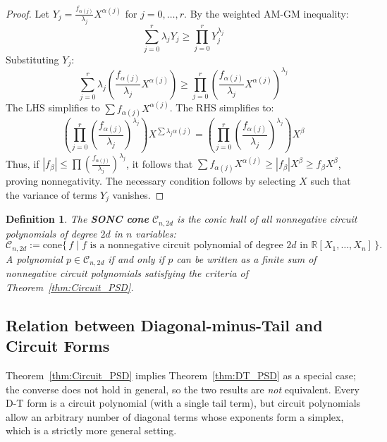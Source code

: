 \documentclass{article}
\newtheorem{definition}{Definition}
\begin{document}
\begin{proof}
Let $Y_j = \frac{f_{\alpha(j)}}{\lambda_j} X^{\alpha(j)}$ for $j = 0, \dots, r$. By the weighted AM-GM inequality:
\[
   \sum_{j=0}^r \lambda_j Y_j \geq \prod_{j=0}^r Y_j^{\lambda_j}
\]
Substituting $Y_j$:
\[
   \sum_{j=0}^r \lambda_j \left( \frac{f_{\alpha(j)}}{\lambda_j} X^{\alpha(j)} \right) \geq \prod_{j=0}^r \left( \frac{f_{\alpha(j)}}{\lambda_j} X^{\alpha(j)} \right)^{\lambda_j}
\]
The LHS simplifies to $\sum f_{\alpha(j)} X^{\alpha(j)}$. The RHS simplifies to:
\[
   \left( \prod_{j=0}^r \left( \frac{f_{\alpha(j)}}{\lambda_j} \right)^{\lambda_j} \right) X^{\sum \lambda_j \alpha(j)} = \left( \prod_{j=0}^r \left( \frac{f_{\alpha(j)}}{\lambda_j} \right)^{\lambda_j} \right) X^{\beta}
\]
Thus, if $|f_\beta| \le \prod (\frac{f_{\alpha(j)}}{\lambda_j})^{\lambda_j}$, it follows that $\sum f_{\alpha(j)} X^{\alpha(j)} \ge |f_\beta| X^\beta \ge f_\beta X^\beta$, proving nonnegativity. The necessary condition follows by selecting $X$ such that the variance of terms $Y_j$ vanishes.
\end{proof}

\begin{definition}\label{def:SONC}
The \textbf{SONC cone} $\mathcal{C}_{n,2d}$ is the conic hull of all nonnegative circuit polynomials of 
degree $2d$ in $n$ variables:
\[
   \mathcal{C}_{n,2d} := \mathrm{cone}\bigl\{\,f \mid f \text{ is a nonnegative circuit polynomial of degree } 
   2d \text{ in } \mathbb{R}[X_1,\dots,X_n]\,\bigr\}.
\]
A polynomial $p \in \mathcal{C}_{n,2d}$ if and only if $p$ can be written as a finite sum of nonnegative 
circuit polynomials satisfying the criteria of Theorem~\ref{thm:Circuit_PSD}.
\end{definition}

\subsection{Relation between Diagonal-minus-Tail and Circuit Forms}

Theorem~\ref{thm:Circuit_PSD} implies Theorem~\ref{thm:DT_PSD} as a special case; the converse does not 
hold in general, so the two results are \emph{not} equivalent. Every D-T form is a circuit polynomial 
(with a single tail term), but circuit polynomials allow an arbitrary number of diagonal terms whose 
exponents form a simplex, which is a strictly more general setting.
\end{document}
